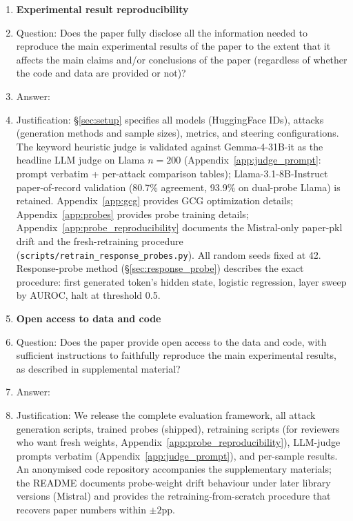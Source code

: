 \begin{enumerate}
    \item {\bf Experimental result reproducibility}
    \item[] Question: Does the paper fully disclose all the information needed to reproduce the main experimental results of the paper to the extent that it affects the main claims and/or conclusions of the paper (regardless of whether the code and data are provided or not)?
    \item[] Answer: \answerYes{}
    \item[] Justification: \S\ref{sec:setup} specifies all models (HuggingFace IDs), attacks (generation methods and sample sizes), metrics, and steering configurations. The keyword heuristic judge is validated against Gemma-4-31B-it as the headline LLM judge on Llama $n=200$ (Appendix~\ref{app:judge_prompt}: prompt verbatim + per-attack comparison tables); Llama-3.1-8B-Instruct paper-of-record validation (80.7\% agreement, 93.9\% on dual-probe Llama) is retained. Appendix~\ref{app:gcg} provides GCG optimization details; Appendix~\ref{app:probes} provides probe training details; Appendix~\ref{app:probe_reproducibility} documents the Mistral-only paper-pkl drift and the fresh-retraining procedure (\texttt{scripts/retrain\_response\_probes.py}). All random seeds fixed at 42. Response-probe method (\S\ref{sec:response_probe}) describes the exact procedure: first generated token's hidden state, logistic regression, layer sweep by AUROC, halt at threshold 0.5.

\item {\bf Open access to data and code}
    \item[] Question: Does the paper provide open access to the data and code, with sufficient instructions to faithfully reproduce the main experimental results, as described in supplemental material?
    \item[] Answer: \answerYes{}
    \item[] Justification: We release the complete evaluation framework, all attack generation scripts, trained probes (shipped), retraining scripts (for reviewers who want fresh weights, Appendix~\ref{app:probe_reproducibility}), LLM-judge prompts verbatim (Appendix~\ref{app:judge_prompt}), and per-sample results. An anonymised code repository accompanies the supplementary materials; the README documents probe-weight drift behaviour under later library versions (Mistral) and provides the retraining-from-scratch procedure that recovers paper numbers within $\pm 2$pp.


\end{enumerate}
